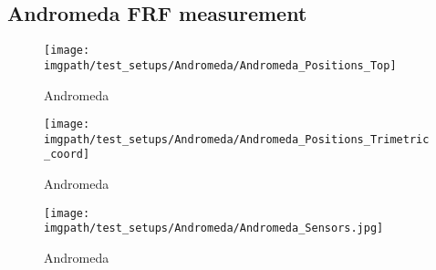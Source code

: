 \subsection{Andromeda FRF measurement}

\begin{figure}[!htb]
    \centering
    \texttt{[image: \\imgpath/test\_setups/Andromeda/Andromeda\_Positions\_Top]}
    \caption[Andromeda Positions Top View]{Andromeda}
    \label{Andromeda_Positions_Top}
\end{figure}

\begin{figure}[!htb]
    \centering
    \texttt{[image: \\imgpath/test\_setups/Andromeda/Andromeda\_Positions\_Trimetric\_coord]}
    \caption[Andromeda Positions Trimetric View]{Andromeda}
    \label{Andromeda_Positions_Trimetric_coord}
\end{figure}

\begin{figure}[!htb]
    \centering
    \texttt{[image: \\imgpath/test\_setups/Andromeda/Andromeda\_Sensors.jpg]}
    \caption[Andromeda Positions Sensors View]{Andromeda}
    \label{Andromeda_Sensors}
\end{figure}

